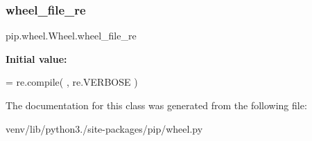 \subsubsection{\texorpdfstring{wheel\+\_\+file\+\_\+re}{wheel\_file\_re}}
{\footnotesize\ttfamily pip.\+wheel.\+Wheel.\+wheel\+\_\+file\+\_\+re\hspace{0.3cm}{\ttfamily [static]}}

{\bfseries Initial value\+:}
\begin{DoxyCode}
=  re.compile(
        ,
        re.VERBOSE
    )
\end{DoxyCode}


The documentation for this class was generated from the following file\+:\begin{DoxyCompactItemize}
\item 
venv/lib/python3./site-\/packages/pip/wheel.\+py\end{DoxyCompactItemize}
